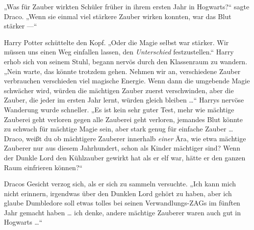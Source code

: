 „Was für Zauber wirkten Schüler früher in ihrem ersten Jahr in Hogwarts?“ sagte Draco.
„Wenn sie einmal viel stärkere Zauber wirken konnten, war das Blut stärker —“

Harry Potter schüttelte den Kopf.
„Oder die Magie selbst war stärker. Wir müssen uns einen Weg einfallen lassen, den \emph{Unterschied} festzustellen.“ Harry erhob sich von seinem Stuhl, begann nervös durch den Klassenraum zu wandern.
„Nein warte, das könnte trotzdem gehen. Nehmen wir an, verschiedene Zauber verbrauchen verschieden viel magische Energie. Wenn dann die umgebende Magie schwächer wird, würden die mächtigen Zauber zuerst verschwinden, aber die Zauber, die jeder im ersten Jahr lernt, würden gleich bleiben …“ Harrys nervöse Wanderung wurde schneller.
„Es ist kein sehr guter Test, mehr wie mächtige Zauberei geht verloren gegen alle Zauberei geht verloren, jemandes Blut könnte zu schwach für mächtige Magie sein, aber stark genug für einfache Zauber … Draco, weißt du ob mächtigere Zauberer innerhalb \emph{einer} Ära, wie etwa mächtige Zauberer nur aus diesem Jahrhundert, schon als Kinder mächtiger sind? Wenn der Dunkle Lord den Kühlzauber gewirkt hat als er elf war, hätte er den ganzen Raum einfrieren können?“

Dracos Gesicht verzog sich, als er sich zu sammeln versuchte.
„Ich kann mich nicht erinnern, irgendwas über den Dunklen Lord gehört zu haben, aber ich glaube Dumbledore soll etwas tolles bei seinen Verwandlungs-ZAGs im fünften Jahr gemacht haben … ich denke, andere mächtige Zauberer waren auch gut in Hogwarts …“

